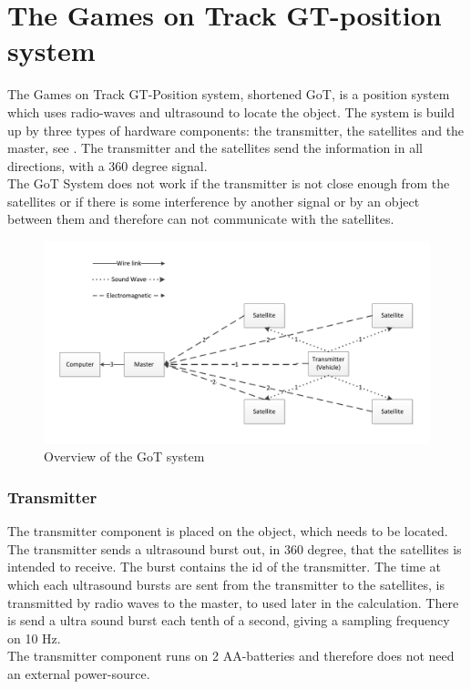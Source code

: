 \section{The Games on Track GT-position system}
\label{GoTDescription}
The Games on Track GT-Position system, shortened GoT, is a position system which uses radio-waves and ultrasound to locate the object. The system is build up by three types of hardware components: the transmitter, the satellites and the master, see . The transmitter and the satellites send the information in all directions, with a 360 degree signal.\\
The GoT System does not work if the transmitter is not close enough from the satellites or if there is some interference by another signal or by an object between them and therefore can not communicate with the satellites.

\begin{figure}[H]
	\centering
	\includegraphics[scale=0.6]{figures/GoT_description.pdf}
	\caption{Overview of the GoT system}
	\label{fig:GoTSystem}
\end{figure}

\subsubsection{Transmitter}
The transmitter component is placed on the object, which needs to be located. The transmitter sends a ultrasound burst out, in 360 degree, that the satellites is intended to receive. The burst contains the id of the transmitter. The time at which each ultrasound bursts are sent from the transmitter to the satellites, is transmitted by radio waves to the master, to used later in the calculation. There is send a ultra sound burst each tenth of a second, giving a sampling frequency on 10 Hz.\\ 
The transmitter component runs on 2 AA-batteries and therefore does not need an external power-source.\\

